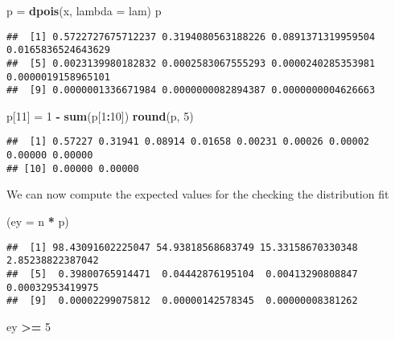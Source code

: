 \documentclass[
]{article}
\newenvironment{Shaded}{\begin{snugshade}}{\end{snugshade}}
\newcommand{\DataTypeTok}[1]{\textcolor[rgb]{0.13,0.29,0.53}{#1}}
\newcommand{\DecValTok}[1]{\textcolor[rgb]{0.00,0.00,0.81}{#1}}
\newcommand{\KeywordTok}[1]{\textcolor[rgb]{0.13,0.29,0.53}{\textbf{#1}}}
\newcommand{\NormalTok}[1]{#1}
\newcommand{\OperatorTok}[1]{\textcolor[rgb]{0.81,0.36,0.00}{\textbf{#1}}}
\newcommand{\StringTok}[1]{\textcolor[rgb]{0.31,0.60,0.02}{#1}}
\begin{document}
\begin{Shaded}
\begin{Highlighting}[]
\NormalTok{p =}\StringTok{ }\KeywordTok{dpois}\NormalTok{(x, }\DataTypeTok{lambda =}\NormalTok{ lam)}
\NormalTok{p}
\end{Highlighting}
\end{Shaded}

\begin{verbatim}
##  [1] 0.5722727675712237 0.3194080563188226 0.0891371319959504 0.0165836524643629
##  [5] 0.0023139980182832 0.0002583067555293 0.0000240285353981 0.0000019158965101
##  [9] 0.0000001336671984 0.0000000082894387 0.0000000004626663
\end{verbatim}

\begin{Shaded}
\begin{Highlighting}[]
\NormalTok{p[}\DecValTok{11}\NormalTok{] =}\StringTok{ }\DecValTok{1} \OperatorTok{-}\StringTok{ }\KeywordTok{sum}\NormalTok{(p[}\DecValTok{1}\OperatorTok{:}\DecValTok{10}\NormalTok{])}
\KeywordTok{round}\NormalTok{(p, }\DecValTok{5}\NormalTok{)}
\end{Highlighting}
\end{Shaded}

\begin{verbatim}
##  [1] 0.57227 0.31941 0.08914 0.01658 0.00231 0.00026 0.00002 0.00000 0.00000
## [10] 0.00000 0.00000
\end{verbatim}

We can now compute the expected values for the checking the distribution
fit

\begin{Shaded}
\begin{Highlighting}[]
\NormalTok{(}\DataTypeTok{ey =}\NormalTok{ n }\OperatorTok{*}\StringTok{ }\NormalTok{p)}
\end{Highlighting}
\end{Shaded}

\begin{verbatim}
##  [1] 98.43091602225047 54.93818568683749 15.33158670330348  2.85238822387042
##  [5]  0.39800765914471  0.04442876195104  0.00413290808847  0.00032953419975
##  [9]  0.00002299075812  0.00000142578345  0.00000008381262
\end{verbatim}

\begin{Shaded}
\begin{Highlighting}[]
\NormalTok{ey }\OperatorTok{>=}\StringTok{ }\DecValTok{5}
\end{Highlighting}
\end{Shaded}
\end{document}

